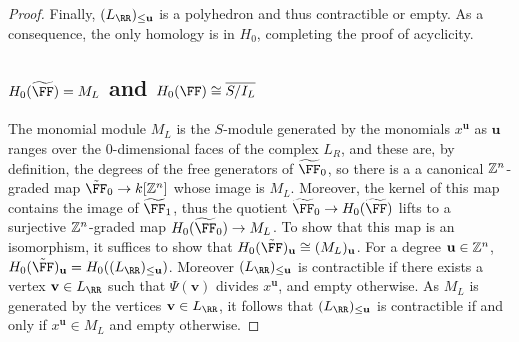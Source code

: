 \documentclass{amsart}
\begin{document}
\begin{proof}
 Finally, $(L_{\RR})_{\leq \mathbf{u}}$ is a polyhedron and thus contractible or empty. As a consequence, the only homology is in $H_0$, completing the proof of acyclicity.

\subsection{$\HH_0(\tF)= M_L$ and $\HH_0(\FF) \cong \overline{S/I_L}$}

The monomial module $M_L$ is the $S$-module
generated by the monomials $x^{\mathbf u}$ as $\mathbf u$ ranges
over the 0-dimensional faces of the complex $L_R$, and these are, by definition, the degrees
of the free generators of $\tF_0$, so there is a a canonical $\mathbb Z^n$-graded map $\tilde \FF_0\rightarrow k[\ZZ^n]$ whose image is $M_L$.
Moreover, the kernel of this map contains the image of $\tF_1$, thus the quotient $\tF_0\rightarrow H_0(\tF)$ lifts to a surjective $\mathbb Z^n$-graded map $H_0(\tF_0) \rightarrow M_L$. To show that this map is an isomorphism, it suffices to show that $H_0(\tilde \FF)_{\mathbf{u}}\cong (M_L)_{\mathbf{u}}$. 
For a degree $\mathbf{u}\in \mathbb Z^n$,
  $H_0(\tilde \FF)_{\mathbf{u}}=H_0((L_{\RR})_{\leq \mathbf{u}})$. Moreover $(L_{\RR})_{\leq \mathbf{u}}$ is contractible if there exists a vertex $\mathbf{v}\in L_{\RR}$ such that $\Psi(\mathbf{v})$ divides $x^{\mathbf{u}}$, and empty otherwise. As $M_L$ is generated by the vertices $\mathbf{v}\in L_{\RR}$, it follows that $(L_{\RR})_{\leq \mathbf{u}}$ is contractible if and only if $x^{\mathbf{u}}\in M_L$ and empty otherwise.




\end{proof}
\end{document}
